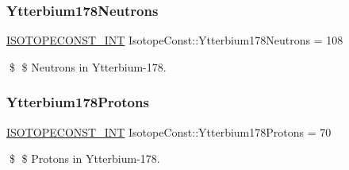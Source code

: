 \subsubsection{\texorpdfstring{Ytterbium178\+Neutrons}{Ytterbium178Neutrons}}
{\footnotesize\ttfamily \mbox{\hyperlink{group___isotope_const-_macros_ga5f18360b3e99483a35c32d789e62621c}{I\+S\+O\+T\+O\+P\+E\+C\+O\+N\+S\+T\+\_\+\+I\+NT}} Isotope\+Const\+::\+Ytterbium178\+Neutrons = 108}

\$ \$ Neutrons in Ytterbium-\/178. \mbox{\label{group___isotope_const-_ytterbium-_yb178_ga01108ea5f2040fca9da221d7990d43fd}} 
\subsubsection{\texorpdfstring{Ytterbium178\+Protons}{Ytterbium178Protons}}
{\footnotesize\ttfamily \mbox{\hyperlink{group___isotope_const-_macros_ga5f18360b3e99483a35c32d789e62621c}{I\+S\+O\+T\+O\+P\+E\+C\+O\+N\+S\+T\+\_\+\+I\+NT}} Isotope\+Const\+::\+Ytterbium178\+Protons = 70}

\$ \$ Protons in Ytterbium-\/178. 